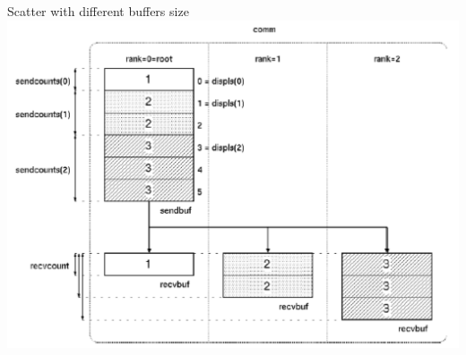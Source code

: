 \documentclass[aspectratio=43]{beamer}
\begin{document}
\begin{frame}{Scatter with different buffers size}
\includegraphics[scale=0.5]{03.MPI_Coll/scatter2.pdf}
\end{frame}
\end{document}
